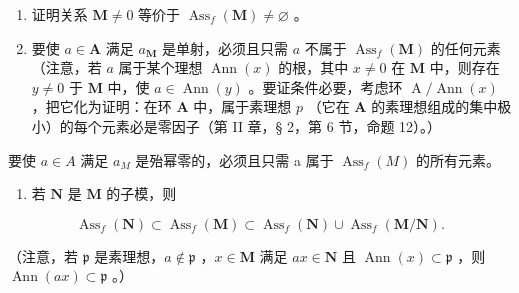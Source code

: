 \begin{enumerate}
\def\labelenumi{(\alph{enumi})}
\item
  证明关系 \(\mathbf{M} \neq 0\) 等价于 \(\operatorname{Ass}_f(\mathbf{M}) \neq \varnothing\) 。
\item
  要使 \(a \in \mathbf{A}\) 满足 \(a_{\mathbf{M}}\) 是单射，必须且只需 \(a\) 不属于 \(\operatorname{Ass}_f(\mathbf{M})\) 的任何元素（注意，若 \(a\) 属于某个理想 \(\operatorname{Ann}(x)\) 的根，其中 \(x \neq 0\) 在 \(\mathbf{M}\) 中，则存在 \(y \neq 0\) 于 \(\mathbf{M}\) 中，使 \(a \in \operatorname{Ann}(y)\) 。要证条件必要，考虑环 \(\operatorname{A}/\operatorname{Ann}(x)\) ，把它化为证明：在环 \(\mathbf{A}\) 中，属于素理想 \(p\) （它在 \(\mathbf{A}\) 的素理想组成的集中极小）的每个元素必是零因子（第 II 章，§ 2，第 6 节，命题 12）。）
\end{enumerate}

要使 \(a \in A\) 满足 \(a_{M}\) 是殆幂零的，必须且只需 a 属于 \(\operatorname{Ass}_{f}(M)\) 的所有元素。

\begin{enumerate}
\def\labelenumi{(\alph{enumi})}
\setcounter{enumi}{2}
\tightlist
\item
  若 \(\mathbf{N}\) 是 \(\mathbf{M}\) 的子模，则
\end{enumerate}

\[
\operatorname{Ass} _ {f} (\mathbf {N}) \subset \operatorname{Ass} _ {f} (\mathbf {M}) \subset \operatorname{Ass} _ {f} (\mathbf {N}) \cup \operatorname{Ass} _ {f} (\mathbf {M} / \mathbf {N}).
\]

（注意，若 \(\mathfrak{p}\) 是素理想，\(a \notin \mathfrak{p}\) ，\(x \in \mathbf{M}\) 满足 \(ax \in \mathbf{N}\) 且 \(\operatorname{Ann}(x) \subset \mathfrak{p}\) ，则 \(\operatorname{Ann}(ax) \subset \mathfrak{p}\) 。）

